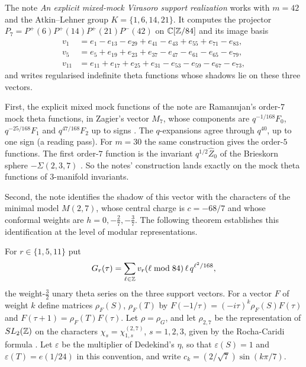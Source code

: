 The note \emph{An explicit mixed-mock Virasoro support realization} works with $m=42$ and the Atkin--Lehner group $K=\{1,6,14,21\}$. It computes the projector $P_7=P^+(6)P^+(14)P^+(21)P^-(42)$ on $\mathbb{C}[\mathbb{Z}/84]$ and its image basis
\begin{align*}
v_1&=e_1-e_{13}-e_{29}+e_{41}-e_{43}+e_{55}+e_{71}-e_{83},\\
v_5&=e_5+e_{19}+e_{23}+e_{37}-e_{47}-e_{61}-e_{65}-e_{79},\\
v_{11}&=e_{11}+e_{17}+e_{25}+e_{31}-e_{53}-e_{59}-e_{67}-e_{73},
\end{align*}
and writes regularised indefinite theta functions whose shadows lie on these three vectors.

First, the explicit mixed mock functions of the note are Ramanujan's order-$7$ mock theta functions, in Zagier's vector $M_7$, whose components are $q^{-1/168}F_0$, $q^{-25/168}F_1$ and $q^{47/168}F_2$ up to signs \cite{Zagier}. The $q$-expansions agree through $q^{40}$, up to one sign (a reading pass). For $m=30$ the same construction gives the order-$5$ functions. The first order-$7$ function is the invariant $q^{1/2}\widehat Z_0$ of the Brieskorn sphere $-\Sigma(2,3,7)$ \cite[eq.~(3.20)]{CFS}. So the notes' construction lands exactly on the mock theta functions of $3$-manifold invariants.

Second, the note identifies the shadow of this vector with the characters of the minimal model $M(2,7)$, whose central charge is $c=-68/7$ and whose conformal weights are $h=0,-\tfrac27,-\tfrac37$. The following theorem establishes this identification at the level of modular representations.

For $r\in\{1,5,11\}$ put
\[
G_r(\tau)=\sum_{\ell\in\mathbb{Z}}v_r(\ell\bmod84)\,\ell\,q^{\ell^2/168},
\]
the weight-$\tfrac32$ unary theta series on the three support vectors. For a vector $F$ of weight $k$ define matrices $\rho_F(S)$, $\rho_F(T)$ by $F(-1/\tau)=(-i\tau)^k\rho_F(S)F(\tau)$ and $F(\tau+1)=\rho_F(T)F(\tau)$. Let $\rho=\rho_G$, and let $\rho_{2,7}$ be the representation of $SL_2(\mathbb{Z})$ on the characters $\chi_s=\chi^{(2,7)}_{1,s}$, $s=1,2,3$, given by the Rocha-Caridi formula \cite{RochaCaridi}. Let $\varepsilon$ be the multiplier of Dedekind's $\eta$, so that $\varepsilon(S)=1$ and $\varepsilon(T)=e(1/24)$ in this convention, and write $c_k=(2/\sqrt7)\sin(k\pi/7)$.

